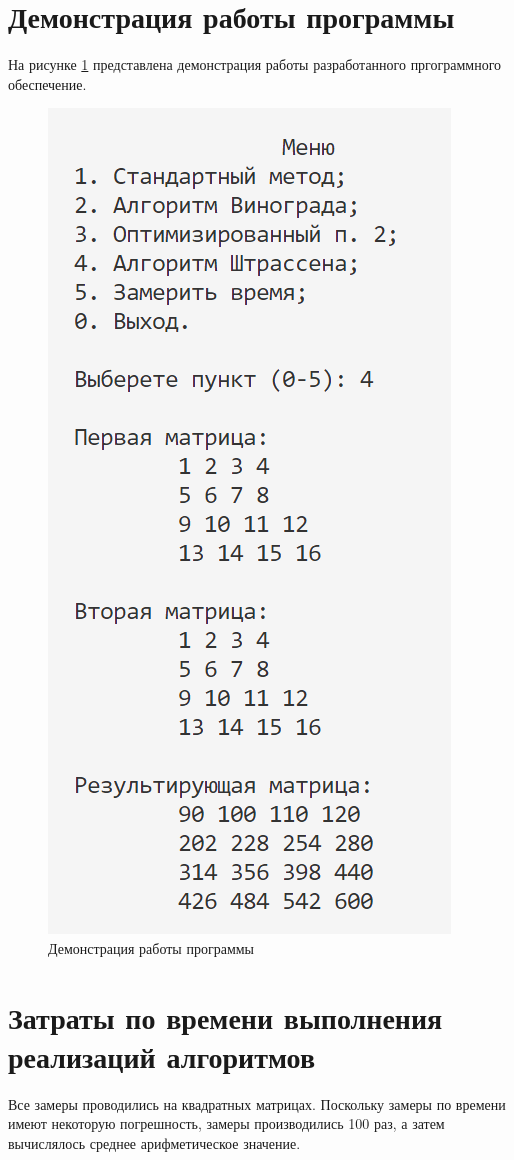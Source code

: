 \section{Демонстрация работы программы}
На рисунке \ref{img:demonstration} представлена демонстрация работы разработанного пргограммного обеспечение.  
\begin{figure}[h]
	\centering
	\includegraphics[height=0.3\textheight]{img/prog_work.png}
	\caption{Демонстрация работы программы}
	\label{img:demonstration}
\end{figure}

\section{Затраты по времени выполнения реализаций алгоритмов}
Все замеры проводились на квадратных матрицах. Поскольку замеры по времени имеют некоторую погрешность, замеры производились 100 раз, а затем вычислялось среднее арифметическое значение.

